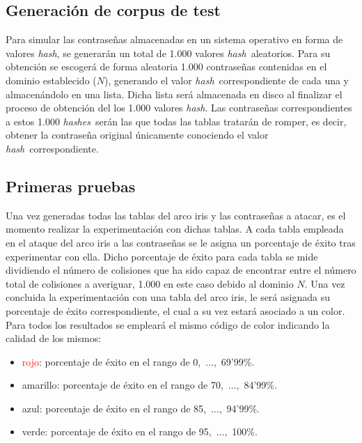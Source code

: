 \documentclass[12pt,spanish,listoffigures,listoftables,listofalgorithms]{tfgetsinf}
\newcommand{\hash}{\textit{hash}}
\newcommand{\hashes}{\textit{hashes}}
\begin{document}
\subsection{Generación de corpus de test} \label{contraseñas}

Para simular las contraseñas almacenadas en un sistema operativo en forma de valores \hash, se generarán un total de 1.000 valores \hash~aleatorios. Para su obtención se escogerá de forma aleatoria 1.000 contraseñas contenidas en el dominio establecido ($N$), generando el valor \hash~correspondiente de cada una y almacenándolo en una lista. Dicha lista será almacenada en disco al finalizar el proceso de obtención del los 1.000 valores \hash. Las contraseñas correspondientes a estos 1.000 \hashes~serán las que todas las tablas tratarán de romper, es decir, obtener la contraseña original únicamente conociendo el valor \hash~correspondiente.

\subsection{Primeras pruebas}\label{primeras pruebas}

Una vez generadas todas las tablas del arco iris y las contraseñas a atacar, es el momento realizar la experimentación con dichas tablas. A cada tabla empleada en el ataque del arco iris a las contraseñas se le asigna un porcentaje de éxito tras experimentar con ella. Dicho porcentaje de éxito para cada tabla se mide dividiendo el número de colisiones que ha sido capaz de encontrar entre el número total de colisiones a averiguar, 1.000 en este caso debido al dominio $N$. Una vez concluida la experimentación con una tabla del arco iris, le será asignada su porcentaje de éxito correspondiente, el cual a su vez estará asociado a un color. Para todos los resultados se empleará el mismo código de color indicando la calidad de los mismos:

\begin{itemize}

    \item \textcolor{red}{rojo}: porcentaje de éxito en el rango de 0,~$\dots$,~69'99\%.
    
    \item \textcolor{y}{amarillo}: porcentaje de éxito en el rango de 70,~$\dots$,~84'99\%.
    
    \item \textcolor{b}{azul}: porcentaje de éxito en el rango de 85,~$\dots$,~94'99\%.
    
    \item \textcolor{g}{verde}: porcentaje de éxito en el rango de 95,~$\dots$,~100\%.
    
\end{itemize}
\end{document}
